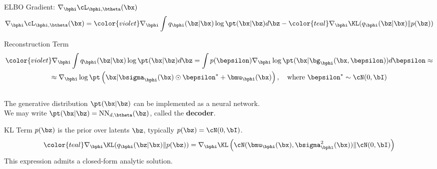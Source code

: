 \documentclass{beamer}
\begin{document}
\begin{frame}{ELBO Gradient: $\nabla_{\bphi} \cL_{\bphi, \btheta}(\bx)$}
	\vspace{-0.3cm}
	\[
		\nabla_{\bphi} \cL_{\bphi, \btheta}(\bx) = {\color{violet}\nabla_{\bphi} \int q_{\bphi}(\bz| \bx)\log \pt(\bx | \bz) d \bz} - {\color{teal}\nabla_{\bphi} \KL(q_{\bphi}(\bz| \bx) \| p(\bz))}
	\]
	\eqpause
	\vspace{-0.3cm}
	\begin{block}{Reconstruction Term}
		\vspace{-0.7cm}
		\begin{multline*}
			 {\color{violet}\nabla_{\bphi} \int q_{\bphi}(\bz| \bx)\log \pt(\bx | \bz) d \bz} = \int p(\bepsilon) \nabla_{\bphi} \log \pt(\bx | \bg_{\bphi}(\bx, \bepsilon)) d\bepsilon \approx \\
			 \approx \nabla_{\bphi} \log \pt\left(\bx | \bsigma_{\bphi}(\bx) \odot \bepsilon^* + \bmu_{\bphi}(\bx)\right), \quad \text{where } \bepsilon^* \sim \cN(0, \bI)
		\end{multline*}
		\eqpause
		\vspace{-0.5cm} \\
		The generative distribution $\pt(\bx | \bz)$ can be implemented as a neural network. \\
		We may write $\pt(\bx | \bz) = \text{NN}_{d, \btheta}(\bz)$, called the \textbf{decoder}.
	\end{block}
	\eqpause
	\begin{block}{KL Term}
		$p(\bz)$ is the prior over latents $\bz$, typically $p(\bz) = \cN (0, \bI)$.
		\[
			{\color{teal}\nabla_{\bphi} \KL(q_{\bphi}(\bz| \bx) \| p(\bz))} = \nabla_{\bphi} \KL\left( \cN (\bmu_{\bphi}(\bx), \bsigma^2_{\bphi}(\bx)) \| \cN (0, \bI) \right)
		\]
		\eqpause
		This expression admits a closed-form analytic solution.
	\end{block}
\end{frame}
\end{document}
